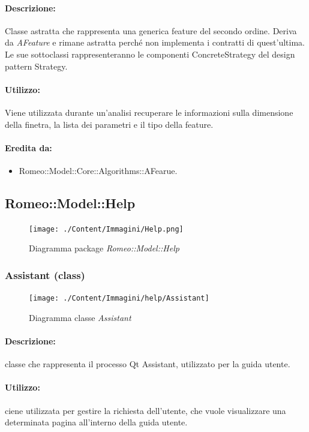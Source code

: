 	\paragraph{Descrizione:} Classe astratta che rappresenta una generica feature\g{} del secondo ordine. Deriva da \textsl{AFeature} e rimane astratta perché non implementa i contratti di quest’ultima. Le sue sottoclassi rappresenteranno le componenti ConcreteStrategy del design pattern\g{} Strategy.
	\paragraph{Utilizzo:} Viene utilizzata durante un’analisi recuperare le informazioni sulla dimensione della finetra, la lista dei parametri e il tipo della feature\g{}.
	\paragraph{Eredita da:}
		\begin{itemize}
			\item Romeo::Model::Core::Algorithms::AFearue.
		\end{itemize}
\subsection{Romeo::Model::Help}
	\begin{figure} [!h]
		\centering
		\texttt{[image: ./Content/Immagini/Help.png]}
		\caption{Diagramma package \textsl{Romeo::Model::Help}}
	\end{figure}
	\subsubsection{Assistant (class)}
	\begin{figure}[!h]
		\centering
		\texttt{[image: ./Content/Immagini/help/Assistant]}
		\caption{Diagramma classe \textsl{Assistant}}
	\end{figure}
	\paragraph{Descrizione:} classe che rappresenta il processo Qt Assistant, utilizzato per la guida utente.
	\paragraph{Utilizzo:} ciene utilizzata per gestire la richiesta dell'utente, che vuole visualizzare una determinata pagina all'interno della guida utente.
